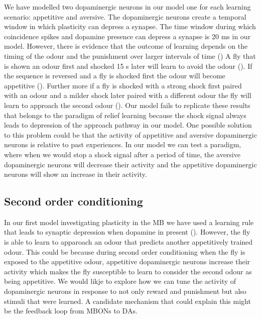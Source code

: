 We have modelled two dopaminergic neurons in our model one for each
learning scenario: appetitive and aversive. The dopaminergic neurons
create a temporal window in which plasticity can depress a synapse.
The time window during which coincidence spikes and dopamine presence
can depress a synapse is 20 ms in our model. However, there is evidence
that the outcome of learning depends on the timing of the odour and
the punishment over larger intervals of time (\citealp{Yarali:2008dt})
A fly that is shown an odour first and shocked 15 s later will learn
to avoid the odour (\citealp{Yarali:2008dt}). If the sequence is
reversed and a fly is shocked first the odour will become appetitive
(\citealp{Yarali:2008dt}). Further more if a fly is shocked with
a strong shock first paired with an odour and a milder shock later
paired with a different odour the fly will learn to approach the second
odour (\citealp{Perisse:2013fp}). Our model fails to replicate these
results that belongs to the paradigm of relief learning because the
shock signal always leads to depression of the approach pathway in
our model. One possible solution to this problem could be that the
activity of appetitive and aversive dopaminergic neurons is relative
to past experiences. In our model we can test a paradigm, where when
we would stop a shock signal after a period of time, the aversive
dopaminergic neurons will decrease their activity and the appetitive
dopaminergic neurons will show an increase in their activity.


\subsection{Second order conditioning}

In our first model investigating plasticity in the MB we have used
a learning rule that leads to synaptic depression when dopamine in
present (\citealp{Greenspan:2004iu}). However, the fly is able to
learn to apparoach an odour that predicts another appetitively trained
odour. This could be because during second order conditioning when
the fly is exposed to the appetitive odour, appetitive dopaminergic
neurons increase their activity which makes the fly susceptible to
learn to consider the second odour as being appetitive. We would likje
to explore how we can tune the activity of dopaminergic neurons in
response to not only reward and punishment but also stimuli that were
learned. A candidate mechanism that could explain this might be the
feedback loop from MBONs to DAs.


